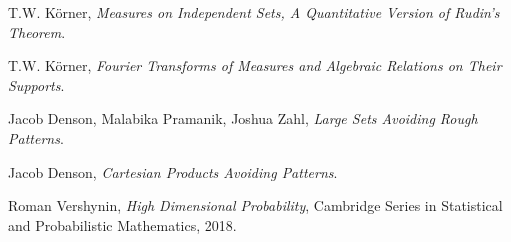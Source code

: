 \documentclass[12pt,reqno]{article}
\numberwithin{equation}{section}
\begin{document}
\begin{thebibliography}{9}

    T.W. K\"{o}rner,
    \textit{Measures on Independent Sets, A Quantitative Version of Rudin's Theorem}.

    T.W. K\"{o}rner,
    \textit{Fourier Transforms of Measures and Algebraic Relations on Their Supports}.

    Jacob Denson, Malabika Pramanik, Joshua Zahl,
    \textit{Large Sets Avoiding Rough Patterns}.

    Jacob Denson,
    \textit{Cartesian Products Avoiding Patterns}.

    Roman Vershynin,
    \textit{High Dimensional Probability},
    Cambridge Series in Statistical and Probabilistic Mathematics,
    2018.

\end{thebibliography}
\end{document}
